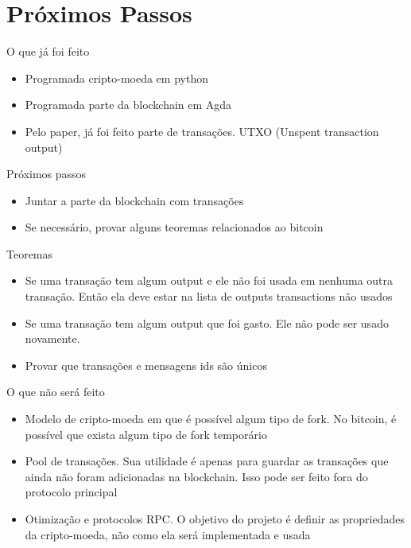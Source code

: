 \documentclass{beamer}
\begin{document}
\section{Próximos Passos}

\begin{frame}{O que já foi feito}
  \begin{itemize}
      \item Programada cripto-moeda em python
      \item Programada parte da blockchain em Agda
      \item Pelo paper, já foi feito parte de transações. UTXO (Unspent transaction output)
  \end{itemize}
\end{frame}

  
\begin{frame}{Próximos passos}
  \begin{itemize}
      \item Juntar a parte da blockchain com transações
      \item Se necessário, provar alguns teoremas relacionados ao bitcoin
  \end{itemize}
\end{frame}

\begin{frame}{Teoremas}
  \begin{itemize}
      \item Se uma transação tem algum output e ele não foi usada em nenhuma outra transação. Então ela deve estar na lista de outputs transactions não usados
      \item Se uma transação tem algum output que foi gasto. Ele não pode ser usado novamente.
      \item Provar que transações e mensagens ids são únicos
  \end{itemize}
\end{frame}

\begin{frame}{O que não será feito}
  \begin{itemize}
    \item Modelo de cripto-moeda em que é possível algum tipo de fork. No bitcoin, é possível que exista algum tipo de fork temporário
    \item Pool de transações. Sua utilidade é apenas para guardar as transações que ainda não foram adicionadas na blockchain. 
    Isso pode ser feito fora do protocolo principal
    \item Otimização e protocolos RPC. O objetivo do projeto é definir as propriedades da cripto-moeda, não como ela será implementada e usada
  \end{itemize}
\end{frame}
\end{document}
